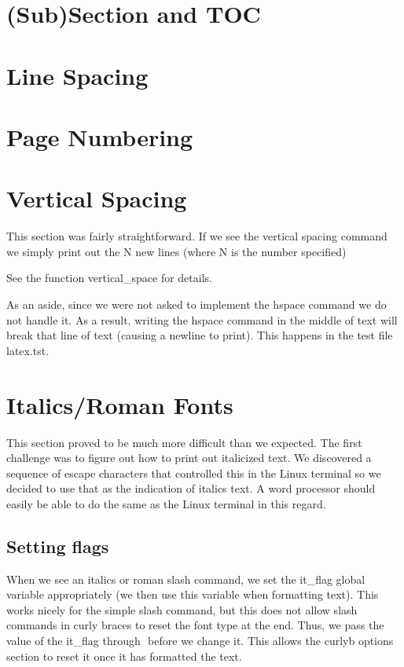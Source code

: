 
\renewcommand{\baselinestretch}{1}

\section{(Sub)Section and TOC}

\section{Line Spacing}

\section{Page Numbering}

\section{Vertical Spacing}

This section was fairly straightforward. If we see the vertical spacing command we
simply print out the N new lines (where N is the number specified) 

See the function vertical_space for details.

As an aside, since we were not asked to implement the hspace command we do not handle
it. As a result, writing the hspace command in the middle of text will break that line
of text (causing a newline to print). This happens in the test file latex.tst.

\section{Italics/Roman Fonts}

This section proved to be much more difficult than we expected. The first challenge
was to figure out how to print out italicized text. We discovered a sequence of
escape characters that controlled this in the Linux terminal so we decided to use that
as the indication of italics text. A word processor should easily be able to do the same
as the Linux terminal in this regard.

\subsection{Setting flags}
When we see an italics or roman slash command, we set the it_flag global variable 
appropriately (we then use this variable when formatting text). This works nicely
for the simple slash command, but this does not allow slash commands in curly braces
to reset the font type at the end. Thus, we pass the value of the it_flag through $$ before
we change it. This allows the curlyb options section to reset it once it has formatted the
text.

